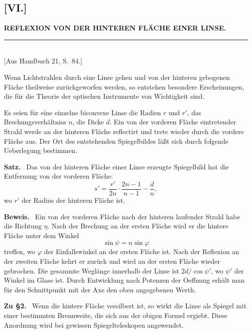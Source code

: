 \documentclass[12pt,a4paper]{article}
\theoremstyle{plain}
\theoremstyle{definition}
\theoremstyle{remark}
\begin{document}
\subsection*{[VI.]}
\begin{center}
\textbf{REFLEXION VON DER HINTEREN FL\"ACHE EINER LINSE.}
\end{center}
\begin{center}
\rule{6cm}{0.4pt}\\[4pt]
[Aus Handbuch 21, S.~84.]
\end{center}

Wenn Lichtstrahlen durch eine Linse gehen und von der hinteren
gebogenen Fl\"ache theilweise zur\"uckgeworfen werden, so entstehen
besondere Erscheinungen, die f\"ur die Theorie der optischen
Instrumente von Wichtigkeit sind.

Es seien f\"ur eine einzelne biconvexe Linse die Radien $r$ und $r'$,
das Brechungsverh\"altniss $n$, die Dicke $d$. Ein von der
vorderen Fl\"ache eintretender Strahl werde an der hinteren Fl\"ache
reflectirt und trete wieder durch die vordere Fl\"ache aus. Der
Ort des entstehenden Spiegelbildes l\"a\ss t sich durch folgende
Ueberlegung bestimmen.

\textbf{Satz.} \ Das von der hinteren Fl\"ache einer Linse erzeugte
Spiegelbild hat die Entfernung von der vorderen Fl\"ache:
\[
s' = \frac{r'}{2n}\cdot\frac{2n-1}{n-1} - \frac{d}{n},
\]
wo $r'$ der Radius der hinteren Fl\"ache ist.

\textbf{Beweis.} \ Ein von der vorderen Fl\"ache nach der hinteren
laufender Strahl habe die Richtung $\eta$. Nach der Brechung an der
ersten Fl\"ache wird er die hintere Fl\"ache unter dem Winkel
\[
\sin\psi = n\sin\varphi
\]
treffen, wo $\varphi$ der Einfallswinkel an der ersten Fl\"ache ist.
Nach der Reflexion an der zweiten Fl\"ache kehrt er zur\"uck und wird
an der ersten Fl\"ache wieder gebrochen. Die gesammte Wegl\"ange
innerhalb der Linse ist $2d/\cos\psi'$, wo $\psi'$ der Winkel im
Glase ist. Durch Entwicklung nach Potenzen der Oeffnung erh\"alt man
f\"ur den Schnittpunkt mit der Axe den oben angegebenen Werth.

\medskip

\textbf{Zu \S 2.} \ Wenn die hintere Fl\"ache versilbert ist, so
wirkt die Linse als Spiegel mit einer bestimmten Brennweite, die
sich aus der obigen Formel ergiebt. Diese Anordnung wird bei
gewissen Spiegelteleskopen angewendet.
\end{document}
